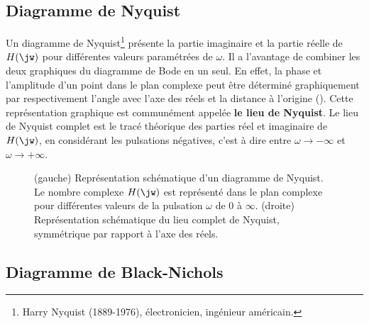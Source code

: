 \subsection{Diagramme de Nyquist}


Un diagramme de Nyquist\footnote{Harry 
Nyquist (1889-1976), électronicien, ingénieur américain.} 
présente la partie imaginaire et la partie réelle de $H(\jw)$ pour différentes 
valeurs paramétrées de $\omega$. Il a l'avantage de combiner les deux 
graphiques du diagramme de Bode en un seul. En effet, la phase et l'amplitude 
d'un point dans le plan complexe peut être déterminé graphiquement par 
respectivement l'angle avec l'axe des réels et la distance à l'origine 
(). Cette représentation graphique est communément appelée 
\textbf{le lieu de Nyquist}. Le lieu de Nyquist complet est le tracé théorique 
des parties réel et imaginaire de $H(\jw)$, en considérant les pulsations 
négatives, c'est à dire entre $\omega\rightarrow-\infty$ et 
$\omega\rightarrow+\infty$. 

\begin{figure}[!h]
    \centering
    
    \hspace{0cm}
    
    \caption{(gauche) Représentation schématique d'un diagramme de Nyquist. 
             Le nombre complexe $H(\jw)$ est représenté dans le plan 
             complexe pour différentes valeurs de la pulsation $\omega$ de 
             0 à $\infty$. (droite) Représentation schématique du lieu 
             complet de Nyquist, symmétrique par rapport à l'axe des réels.
             \label{fig-sche_nyquist}}
\end{figure}


\subsection{Diagramme de Black-Nichols}


